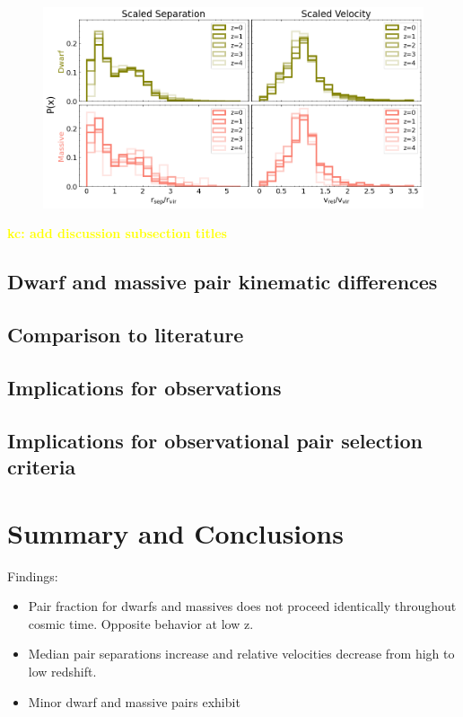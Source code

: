 \documentclass[twocolumn]{aastex631}
\newcommand{\kc}[1]{\textcolor{yellow}{\textbf{kc: #1}} }
\begin{document}
\begin{figure}[htp]
  \centering
  \includegraphics[width=\textwidth]{scaledcombodist_1000.png}
  \caption{}
  \label{fig:scaled-dist}
\end{figure} 


\kc{add discussion subsection titles}
\subsection{Dwarf and massive pair kinematic differences}
\subsection{Comparison to literature}
\subsection{Implications for observations}
\subsection{Implications for observational pair selection criteria}


\section{Summary and Conclusions}
\label{sec:summary}
Findings:
\begin{itemize}
    \item Pair fraction for dwarfs and massives does not proceed identically throughout cosmic time. Opposite behavior at low z. 
    \item Median pair separations increase and relative velocities decrease from high to low redshift. 
    \item Minor dwarf and massive pairs exhibit 
\end{itemize}


{}

\end{document}
